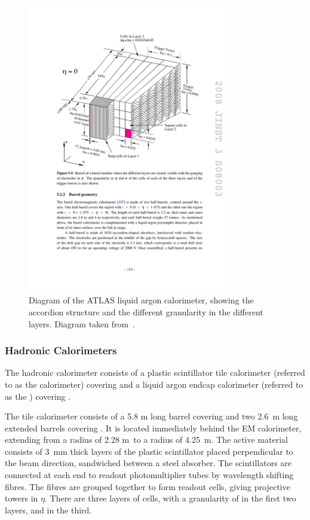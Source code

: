 \begin{figure}[h]
\centering
\includegraphics[width=0.8\textwidth]{lar-diagram}
\caption[Diagram of the ATLAS liquid argon calorimeter, showing the accordion
structure and the different granularity in the different layers. ]{Diagram of the ATLAS liquid argon calorimeter, showing the accordion
structure and the different granularity in the different layers. Diagram taken
from~\cite{1748-0221-3-08-S08003}.}
\label{fig:lar-diagram}
\end{figure}

\subsubsection{Hadronic Calorimeters}

The hadronic calorimeter consists of a plastic scintillator tile calorimeter 
(referred to as the  calorimeter) covering  and a liquid
argon endcap calorimeter (referred to as the ) covering
. 

The tile calorimeter consists of a 5.8 m long barrel covering
 and two 2.6~m long extended barrels covering
.
It is located immediately behind the EM calorimeter, extending from a radius of
2.28 m~to a radius of 4.25~m. The active material consists of 3~mm thick layers of the plastic scintillator 
placed perpendicular to the beam direction, sandwiched between a steel absorber.
The scintillators are connected at each end to
readout photomultiplier tubes by wavelength shifting fibres. The fibres are grouped
together to form readout cells, giving projective towers in $\eta$. There are
three layers of cells, with a granularity of  in the
first two layers, and  in the third.

